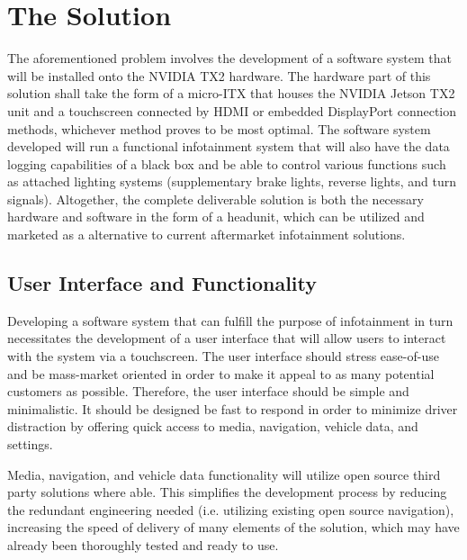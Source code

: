 \documentclass[onecolumn, draftclsnofoot,10pt, compsoc]{IEEEtran}
\begin{document}
\section{The Solution}
The aforementioned problem involves the development of a software system that will be installed onto the NVIDIA TX2 hardware. The hardware part of this solution shall take the form of a micro-ITX that houses the NVIDIA Jetson TX2 unit and a touchscreen connected by HDMI or embedded DisplayPort connection methods, whichever method proves to be most optimal. The software system developed will run a functional infotainment system that will also have the data logging capabilities of a black box and be able to control various functions such as attached lighting systems (supplementary brake lights, reverse lights, and turn signals). Altogether, the complete deliverable solution is both the necessary hardware and software in the form of a headunit, which can be utilized and marketed as a alternative to current aftermarket infotainment solutions.\par

\subsection{User Interface and Functionality}
Developing a software system that can fulfill the purpose of infotainment in turn necessitates the development of a user interface that will allow users to interact with the system via a touchscreen. The user interface should stress ease-of-use and be mass-market oriented in order to make it appeal to as many potential customers as possible. Therefore, the user interface should be simple and minimalistic. It should be designed be fast to respond in order to minimize driver distraction by offering quick access to media, navigation, vehicle data, and settings.\par
Media, navigation, and vehicle data functionality will utilize open source third party solutions where able. This simplifies the development process by reducing the redundant engineering needed (i.e. utilizing existing open source navigation), increasing the speed of delivery of many elements of the solution, which may have already been thoroughly tested and ready to use.\par
\end{document}
